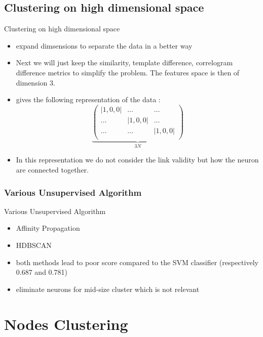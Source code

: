 \documentclass[numbering=fraction]{beamer}
\begin{document}
\subsection{Clustering on high dimensional space}
\begin{frame}{Clustering on high dimensional space}
    \begin{itemize}
        \item expand dimsensions to separate the data in a better way
        \item Next we will just keep the similarity, template difference, correlogram difference metrics to simplify the problem. The features space is then of dimension 3.
        \item gives the following representation of the data :
              $$
                  \underbrace{
                      \begin{pmatrix}
                          |1,0,0| & \dots   & \dots   \\
                          \dots   & |1,0,0| & \dots   \\
                          \dots   & \dots   & |1,0,0| \\
                      \end{pmatrix}}_{3N}
              $$
        \item In this representation we do not consider the link validity but how the neuron are connected together.
    \end{itemize}
\end{frame}
\subsubsection{Various Unsupervised Algorithm}
\begin{frame}{Various Unsupervised Algorithm}
    \begin{itemize}
        \item Affinity Propagation
        \item HDBSCAN
        \item both methods lead to poor score compared to the SVM classifier (respectively 0.687 and 0.781)
        \item eliminate neurons for mid-size cluster which is not relevant
    \end{itemize}
\end{frame}
\section{Nodes Clustering}
\end{document}
